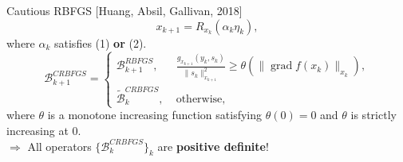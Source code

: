\documentclass[9pt]{beamer}
\begin{document}
\begin{frame}{Cautious RBFGS}
    \vspace{-1\baselineskip}\hfill{\tiny{[Huang, Absil, Gallivan, 2018]}}\\
    \begin{equation*}
        x_{k+1} = R_{x_k}(\alpha_k \eta_k),
    \end{equation*}
    where $\alpha_k$ satisfies (1) \textbf{or} (2). \\[.5\baselineskip]
    \begin{equation*}
        \mathcal{B}^{CRBFGS}_{k+1} = \begin{cases} \mathcal{B}^{RBFGS}_{k+1}, & \; \frac{g_{x_{k+1}}(y_k,s_k)}{\lVert s_k \rVert^{2}_{x_{k+1}}} \geq \theta(\lVert \operatorname{grad} f(x_k) \rVert_{x_k}), \\ \widetilde{\mathcal{B}}^{CRBFGS}_k, & \; \text{otherwise}, \end{cases}
    \end{equation*}
    where $\theta$ is a monotone increasing function satisfying $\theta(0) = 0$ and $\theta$ is strictly increasing at $0$. \\[.5\baselineskip]
    $\Rightarrow$ All operators $\{\mathcal{B}^{CRBFGS}_k\}_k$ are \textbf{positive definite}!
\end{frame}
\end{document}
